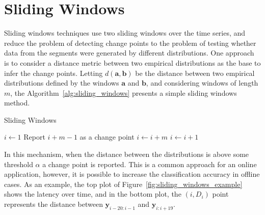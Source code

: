 \section{Sliding Windows}

Sliding windows techniques use two sliding windows over the time series, and
reduce the problem of detecting change points to the problem of testing whether
data from the segments were generated by different distributions. One approach
is to consider a distance metric between two empirical distributions as the base
to infer the change points. Letting $d(\mathbf{a}, \mathbf{b})$ be the distance
between two empirical distributions defined by the windows $\mathbf{a}$ and
$\mathbf{b}$, and considering windows of length $m$, the
Algorithm~\ref{alg:sliding_windows} presents a simple sliding windows method.

\begin{algorithm}[H]
\caption{Sliding Windows}
\label{alg:sliding_windows}
    \begin{algorithmic}[1]
        \State{} $i \gets 1$
                \State{} Report $i + m - 1$ as a change point
                \State{} $i \gets i + m$
             \Else{}
                \State{} $i \gets i + 1$
             \EndIf{}
        \EndWhile{}
    \end{algorithmic}
\end{algorithm}

In this mechanism, when the distance between the distributions is above some
threshold $\alpha$ a change point is reported. This is a common approach for an
online application, however, it is possible to increase the classification
accuracy in offline cases. As an example, the top plot of
Figure~\ref{fig:sliding_windows_example} shows the latency over time, and in
the bottom plot, the $(i, D_{i})$ point represents the distance between
$\mathbf{y}_{i - 20 : i - 1}$ and $\mathbf{y}_{i : i + 19}$.

